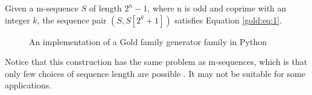 \begin{property}
  Given a m-sequence $S$ of length $2^n - 1$, where n is odd and
  coprime with an integer $k$, the sequence pair $(S, S[2^{k} + 1])$ 
  satisfies Equation \eqref{gold:eq:1}.
\end{property}

\begin{figure}[ht!]
  \caption{An  implementation of a Gold family generator family in Python}
  \label{}
\end{figure}


Notice that this construction has the same problem as m-sequences, which is that only few choices of  sequence length are possible . It may not be suitable for some applications.
